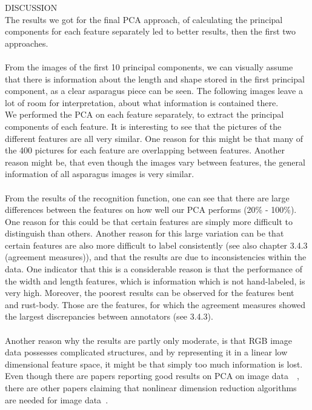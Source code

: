 DISCUSSION \\
The results we got for the final PCA approach, of calculating the principal components for each feature separately led to better results, then the first two approaches. \\
 \\
From the images of the first 10 principal components, we can visually assume that there is information about the length and shape stored in the first principal component, as a clear asparagus piece can be seen. The following images leave a lot of room for interpretation, about what information is contained there. \\
We performed the PCA on each feature separately, to extract the principal components of each feature. It is interesting to see that the pictures of the different features are all very similar. One reason for this might be that many of the 400 pictures for each feature are overlapping between features. Another reason might be, that even though the images vary between features, the general information of all asparagus images is very similar. \\
\\
From the results of the recognition function, one can see that there are large differences between the features on how well our PCA performs (20\% - 100\%). 
One reason for this could be that certain features are simply more difficult to distinguish than others. Another reason for this large variation can be that certain features are also more difficult to label consistently (see also chapter 3.4.3  (agreement measures)), and that the results are due to inconsistencies within the data. One indicator that this is a considerable reason is that the performance of the width and length features, which is information which is not hand-labeled, is very high. Moreover, the poorest results can be observed for the features bent and rust-body. Those are the features, for which the agreement measures showed the largest discrepancies between annotators (see 3.4.3). \\
 \\
Another reason why the results are partly only moderate, is that RGB image data possesses complicated structures, and by representing it in a linear low dimensional feature space, it might be that simply too much information is lost. Even though there are papers reporting good results on PCA on image data~\citep{turk1991face}~\citep{lata2009}, there are other papers claiming that nonlinear dimension reduction algorithms are needed for image data~\citep{article}. 


